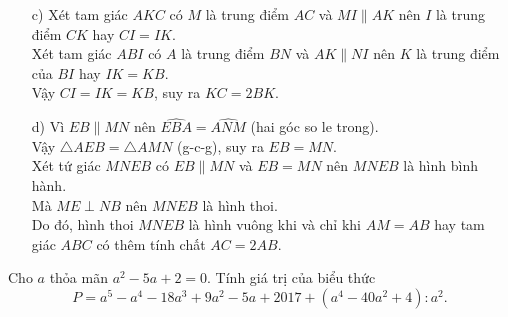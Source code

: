 \begin{bt}
{{
		}	
		\begin{enumerate}
			\item[c)] Xét tam giác $AKC$ có $M$ là trung điểm $AC$ và $MI\parallel AK$ nên $I$ là trung điểm $CK$ hay $CI=IK$.\\
			Xét tam giác $ABI$ có $A$ là trung điểm $BN$ và $AK\parallel NI$ nên $K$ là trung điểm của $BI$ hay $IK=KB$.\\
			Vậy $CI=IK=KB$, suy ra $KC=2BK$.
			\item[d)] Vì $EB\parallel MN$ nên $\widehat{EBA}=\widehat{ANM}$ (hai góc so le trong).\\
			Vậy $\triangle AEB=\triangle AMN$ (g-c-g), suy ra $EB=MN$.\\
			Xét tứ giác $MNEB$ có $EB\parallel MN$ và $EB=MN$ nên $MNEB$ là hình bình hành.\\
			Mà $ME\perp NB$ nên $MNEB$ là hình thoi.\\
			Do đó, hình thoi $MNEB$ là hình vuông khi và chỉ khi $AM=AB$ hay tam giác $ABC$ có thêm tính chất $AC=2AB$.
		\end{enumerate}
	}
\end{bt}
\begin{bt}%
	Cho $a$ thỏa mãn $a^2-5a+2=0$. Tính giá trị của biểu thức
	$$P=a^5-a^4-18a^3+9a^2-5a+2017+(a^4-40a^2+4):a^2.$$
\end{bt}
